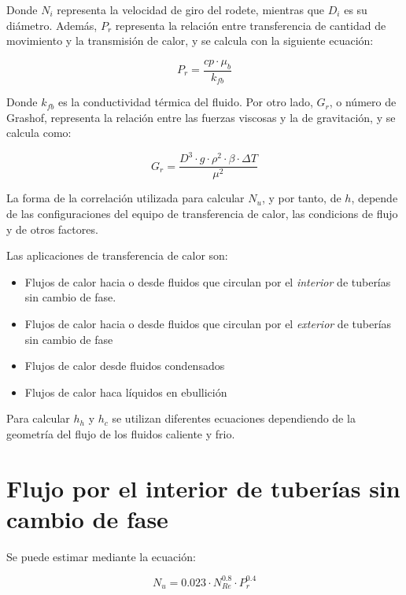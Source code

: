\documentclass{AsignaturaResumen}
\begin{document}
Donde $N_{i}$ representa la velocidad de giro del rodete, mientras que $D_{i}$ es su diámetro. Además, $P_{r}$ representa la relación entre transferencia de cantidad de movimiento y la transmisión de calor, y se calcula con la siguiente ecuación:

\begin{equation}
    P_{r} = \frac{cp \cdot \mu_{b}}{k_{fb}}
\end{equation}

Donde $k_{fb}$ es la conductividad térmica del fluido. Por otro lado, $G_{r}$, o número de Grashof, representa la relación entre las fuerzas viscosas y la de gravitación, y se calcula como:

\begin{equation}
    G_{r} = \frac{D^{3} \cdot g \cdot \rho^{2} \cdot \beta \cdot \Delta T}{\mu^{2}}
\end{equation}

La forma de la correlación utilizada para calcular $N_{u}$, y por tanto, de $h$, depende de las configuraciones del equipo de transferencia de calor, las condicions de flujo y de otros factores.

Las aplicaciones de transferencia de calor son:

\begin{itemize}
    \item Flujos de calor hacia o desde fluidos que circulan por el \emph{interior} de tuberías sin cambio de fase.
    \item Flujos de calor hacia o desde fluidos que circulan por el \emph{exterior} de tuberías sin cambio de fase
    \item Flujos de calor desde fluidos condensados
    \item Flujos de calor haca líquidos en ebullición
\end{itemize}

Para calcular $h_{h}$ y $h_{c}$ se utilizan diferentes ecuaciones dependiendo de la geometría del flujo de los fluidos caliente y frio.

\section{Flujo por el interior de tuberías sin cambio de fase}

Se puede estimar mediante la ecuación:

\begin{equation}
    N_{u} = 0.023 \cdot N_{Re}^{0.8} \cdot P_{r}^{0.4} 
\end{equation}
\end{document}
